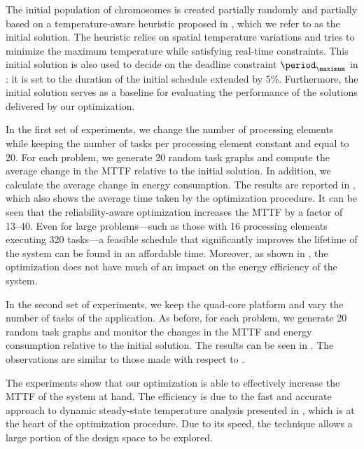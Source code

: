 The initial population of chromosomes is created partially randomly and
partially based on a temperature-aware heuristic proposed in \cite{xie2006},
which we refer to as the initial solution. The heuristic relies on spatial
temperature variations and tries to minimize the maximum temperature while
satisfying real-time constraints. This initial solution is also used to decide
on the deadline constraint $\period_\maximum$ in
: it is set to the duration of the initial
schedule extended by 5\%. Furthermore, the initial solution serves as a baseline
for evaluating the performance of the solutions delivered by our optimization.

In the first set of experiments, we change the number of processing elements \np
while keeping the number of tasks \nt per processing element constant and equal
to 20. For each problem, we generate 20 random task graphs and compute the
average change in the \ac{MTTF} relative to the initial solution. In addition,
we calculate the average change in energy consumption. The results are reported
in , which also shows the average time taken
by the optimization procedure. It can be seen that the reliability-aware
optimization increases the \ac{MTTF} by a factor of 13--40. Even for large
problems---such as those with 16 processing elements executing 320 tasks---a
feasible schedule that significantly improves the lifetime of the system can be
found in an affordable time. Moreover, as shown in
, the optimization does not have much of an
impact on the energy efficiency of the system.

In the second set of experiments, we keep the quad-core platform and vary the
number of tasks \nt of the application. As before, for each problem, we generate
20 random task graphs and monitor the changes in the \ac{MTTF} and energy
consumption relative to the initial solution. The results can be seen in
. The observations are similar to those made with
respect to .

The experiments show that our optimization is able to effectively increase the
\ac{MTTF} of the system at hand. The efficiency is due to the fast and accurate
approach to dynamic steady-state temperature analysis presented in
, which is at the heart of the optimization
procedure. Due to its speed, the technique allows a large portion of the design
space to be explored.

